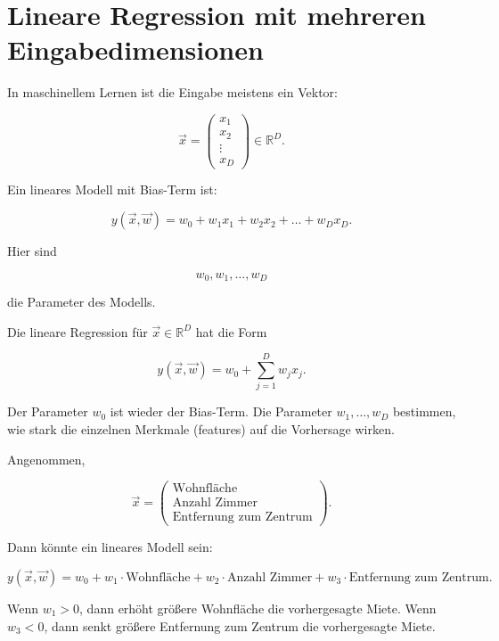\section{Lineare Regression mit mehreren Eingabedimensionen}

In maschinellem Lernen ist die Eingabe meistens ein Vektor:

\[
    \vec{x}
    =
    \begin{pmatrix}
        x_1 \\
        x_2 \\
        \vdots \\
        x_D
    \end{pmatrix}
    \in \mathbb{R}^D.
\]

Ein lineares Modell mit Bias-Term ist:

\[
    y(\vec{x},\vec{w})
    =
    w_0
    +
    w_1x_1
    +
    w_2x_2
    +
    \dots
    +
    w_Dx_D.
\]

Hier sind

\[
    w_0,w_1,\dots,w_D
\]

die Parameter des Modells.

\begin{definitionbox}
Die lineare Regression für \(\vec{x}\in\mathbb{R}^D\) hat die Form

\[
    y(\vec{x},\vec{w})
    =
    w_0
    +
    \sum_{j=1}^{D}
    w_jx_j.
\]
\end{definitionbox}

Der Parameter \(w_0\) ist wieder der Bias-Term.
Die Parameter \(w_1,\dots,w_D\) bestimmen, wie stark die einzelnen Merkmale (features) auf die Vorhersage wirken.

\begin{examplebox}
Angenommen,

\[
    \vec{x}
    =
    \begin{pmatrix}
        \text{Wohnfläche} \\
        \text{Anzahl Zimmer} \\
        \text{Entfernung zum Zentrum}
    \end{pmatrix}.
\]

Dann könnte ein lineares Modell sein:

\[
    y(\vec{x},\vec{w})
    =
    w_0
    +
    w_1 \cdot \text{Wohnfläche}
    +
    w_2 \cdot \text{Anzahl Zimmer}
    +
    w_3 \cdot \text{Entfernung zum Zentrum}.
\]

Wenn \(w_1>0\), dann erhöht größere Wohnfläche die vorhergesagte Miete.
Wenn \(w_3<0\), dann senkt größere Entfernung zum Zentrum die vorhergesagte Miete.
\end{examplebox}

